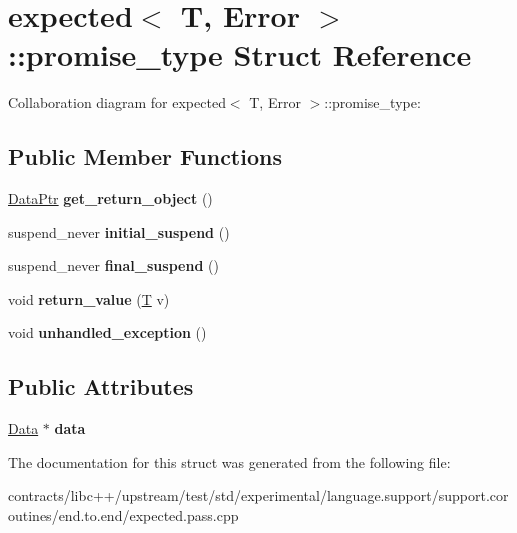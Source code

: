 \hypertarget{structexpected_1_1promise__type}{}\section{expected$<$ T, Error $>$\+:\+:promise\+\_\+type Struct Reference}
\label{structexpected_1_1promise__type}


Collaboration diagram for expected$<$ T, Error $>$\+:\+:promise\+\_\+type\+:
\subsection*{Public Member Functions}
\begin{DoxyCompactItemize}
\item 
\mbox{\label{structexpected_1_1promise__type_a71d4f8302ef418af2184175b258156dd}} 
\mbox{\hyperlink{structexpected_1_1_data_ptr}{Data\+Ptr}} {\bfseries get\+\_\+return\+\_\+object} ()
\item 
\mbox{\label{structexpected_1_1promise__type_ac45436b2048693767aab002f11a06b26}} 
suspend\+\_\+never {\bfseries initial\+\_\+suspend} ()
\item 
\mbox{\label{structexpected_1_1promise__type_acbf9e5f8cef7a53c899499513151697b}} 
suspend\+\_\+never {\bfseries final\+\_\+suspend} ()
\item 
\mbox{\label{structexpected_1_1promise__type_a56f9e842cbe766110216b69aaa7c8bfc}} 
void {\bfseries return\+\_\+value} (\mbox{\hyperlink{struct_t}{T}} v)
\item 
\mbox{\label{structexpected_1_1promise__type_a55ff958695f52fb2eb13905e61ec1c00}} 
void {\bfseries unhandled\+\_\+exception} ()
\end{DoxyCompactItemize}
\subsection*{Public Attributes}
\begin{DoxyCompactItemize}
\item 
\mbox{\label{structexpected_1_1promise__type_a183988e768fc7b2a6a5d24e5b4137d37}} 
\mbox{\hyperlink{structexpected_1_1_data}{Data}} $\ast$ {\bfseries data}
\end{DoxyCompactItemize}


The documentation for this struct was generated from the following file\+:\begin{DoxyCompactItemize}
\item 
contracts/libc++/upstream/test/std/experimental/language.\+support/support.\+coroutines/end.\+to.\+end/expected.\+pass.\+cpp\end{DoxyCompactItemize}
